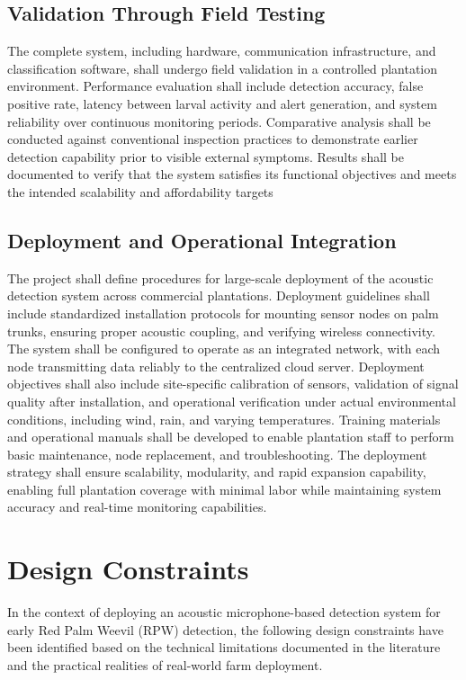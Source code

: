 \documentclass[12pt,a4paper,oneside]{memoir}
\begin{document}
\subsection{Validation Through Field Testing}
 
The complete system, including hardware, communication infrastructure, and classification software, shall undergo field validation in a controlled plantation environment. Performance evaluation shall include detection accuracy, false positive rate, latency between larval activity and alert generation, and system reliability over continuous monitoring periods. Comparative analysis shall be conducted against conventional inspection practices to demonstrate earlier detection capability prior to visible external symptoms. Results shall be documented to verify that the system satisfies its functional objectives and meets the intended scalability and affordability targets
 

\subsection{Deployment and Operational Integration}
 
The project shall define procedures for large-scale deployment of the acoustic detection system across commercial plantations. Deployment guidelines shall include standardized installation protocols for mounting sensor nodes on palm trunks, ensuring proper acoustic coupling, and verifying wireless connectivity. The system shall be configured to operate as an integrated network, with each node transmitting data reliably to the centralized cloud server. Deployment objectives shall also include site-specific calibration of sensors, validation of signal quality after installation, and operational verification under actual environmental conditions, including wind, rain, and varying temperatures. Training materials and operational manuals shall be developed to enable plantation staff to perform basic maintenance, node replacement, and troubleshooting. The deployment strategy shall ensure scalability, modularity, and rapid expansion capability, enabling full plantation coverage with minimal labor while maintaining system accuracy and real-time monitoring capabilities.
 
\section{Design Constraints}
\label{sec:Constraints}
 
In the context of deploying an acoustic microphone-based detection system for early Red Palm Weevil (RPW) detection, the following design constraints have been identified based on the technical limitations documented in the literature and the practical realities of real-world farm deployment.
 
\end{document}
